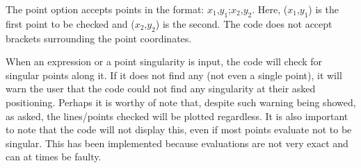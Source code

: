 \documentclass[12pt]{report}
\begin{document}
The point option accepts points in the format: $x_1$,$y_1$;$x_2$,$y_2$. Here, ($x_1$,$y_1$) is the first point to be checked and ($x_2$,$y_2$) is the second. The code does not accept brackets surrounding the point coordinates.

When an expression or a point singularity is input, the code will check for singular points along it. If it does not find any (not even a single point), it will warn the user that the code could not find any singularity at their asked positioning. Perhaps it is worthy of note that, despite such warning being showed, as asked, the lines/points checked will be plotted regardless. It is also important to note that the code will not display this, even if most points evaluate not to be singular. This has been implemented because evaluations are not very exact and can at times be faulty.
\end{document}
